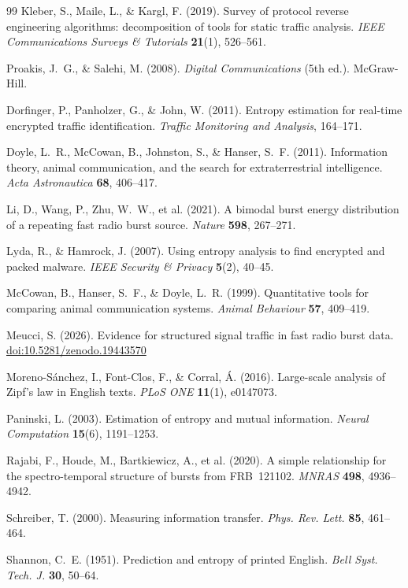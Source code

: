 \documentclass[11pt,a4paper]{article}
\providecommand{\doi}[1]{\href{https://doi.org/#1}{doi:#1}}
\begin{document}
\begin{thebibliography}{99}
 Kleber, S., Maile, L., \& Kargl, F. (2019). Survey of protocol
reverse engineering algorithms: decomposition of tools for static traffic analysis.
\emph{IEEE Communications Surveys \& Tutorials} \textbf{21}(1), 526--561.

 Proakis, J.~G., \& Salehi, M. (2008). \emph{Digital
Communications} (5th ed.). McGraw-Hill.

 Dorfinger, P., Panholzer, G., \& John, W. (2011). Entropy
estimation for real-time encrypted traffic identification. \emph{Traffic Monitoring and
Analysis}, 164--171.

 Doyle, L.~R., McCowan, B., Johnston, S., \& Hanser, S.~F. (2011).
Information theory, animal communication, and the search for extraterrestrial
intelligence. \emph{Acta Astronautica} \textbf{68}, 406--417.

 Li, D., Wang, P., Zhu, W.~W., et al. (2021). A bimodal burst energy
distribution of a repeating fast radio burst source. \emph{Nature} \textbf{598},
267--271.

 Lyda, R., \& Hamrock, J. (2007). Using entropy analysis to find
encrypted and packed malware. \emph{IEEE Security \& Privacy} \textbf{5}(2), 40--45.

 McCowan, B., Hanser, S.~F., \& Doyle, L.~R. (1999). Quantitative
tools for comparing animal communication systems. \emph{Animal Behaviour} \textbf{57},
409--419.

 Meucci, S. (2026). Evidence for structured signal traffic in fast
radio burst data. \doi{10.5281/zenodo.19443570}

 Moreno-S\'anchez, I., Font-Clos, F., \& Corral, \'A. (2016).
Large-scale analysis of Zipf's law in English texts. \emph{PLoS ONE} \textbf{11}(1),
e0147073.

 Paninski, L. (2003). Estimation of entropy and mutual
information. \emph{Neural Computation} \textbf{15}(6), 1191--1253.

 Rajabi, F., Houde, M., Bartkiewicz, A., et al. (2020). A simple
relationship for the spectro-temporal structure of bursts from FRB~121102.
\emph{MNRAS} \textbf{498}, 4936--4942.

 Schreiber, T. (2000). Measuring information transfer.
\emph{Phys. Rev. Lett.} \textbf{85}, 461--464.

 Shannon, C.~E. (1951). Prediction and entropy of printed English.
\emph{Bell Syst. Tech. J.} \textbf{30}, 50--64.


\end{thebibliography}
\end{document}
